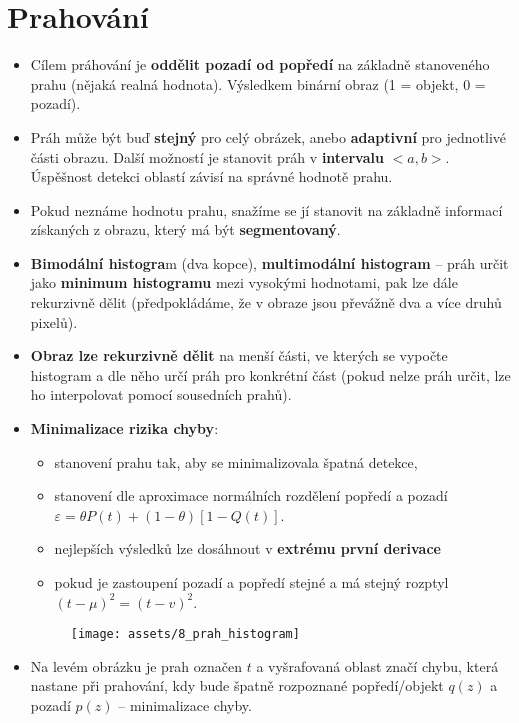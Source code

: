 
\section{Prahování}
\begin{itemize}
    \item Cílem práhování je \textbf{oddělit pozadí od popředí} na základně stanoveného prahu (nějaká realná hodnota). Výsledkem binární obraz (1 = objekt, 0 = pozadí).
    \item Práh může být buď \textbf{stejný} pro celý obrázek, anebo \textbf{adaptivní} pro jednotlivé části obrazu. Další možností je stanovit práh v \textbf{intervalu} $<a, b>$. Úspěšnost detekci oblastí závisí na správné hodnotě prahu.
    \item Pokud neznáme hodnotu prahu, snažíme se jí stanovit na základně informací získaných z obrazu, který má být \textbf{segmentovaný}.
    \item \textbf{Bimodální histogra}m (dva kopce), \textbf{multimodální histogram }-- práh určit jako \textbf{minimum histogramu} mezi vysokými hodnotami, pak lze dále rekurzivně dělit (předpokládáme, že v obraze jsou převážně dva a více druhů pixelů).
    \item \textbf{Obraz lze rekurzivně dělit} na menší části, ve kterých se vypočte histogram a dle něho určí práh pro konkrétní část (pokud nelze práh určit, lze ho interpolovat pomocí sousedních prahů).
    \item \textbf{Minimalizace rizika chyby}:
          \begin{itemize}
              \item stanovení prahu tak, aby se minimalizovala špatná detekce,
              \item stanovení dle aproximace normálních rozdělení popředí a pozadí \\$\varepsilon = \theta P(t) + (1 - \theta)[1 - Q(t)]$.
              \item nejlepších výsledků lze dosáhnout v \textbf{extrému první derivace}
              \item pokud je zastoupení pozadí a popředí stejné a má stejný rozptyl $(t - \mu )^2 = (t - v)^2 $.
          \end{itemize}
          \begin{figure}[H]
              \centering
              \texttt{[image: assets/8\_prah\_histogram]}
          \end{figure}
    \item Na levém obrázku je prah označen $t$ a vyšrafovaná oblast značí chybu, která nastane při prahování, kdy bude špatně rozpoznané popředí/objekt $q(z)$ a pozadí $p(z)$ -- minimalizace chyby.
\end{itemize}


